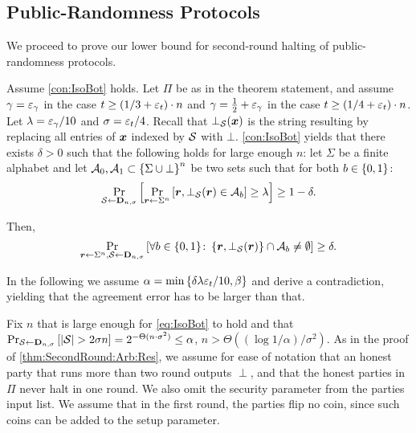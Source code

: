 \subsection{Public-Randomness Protocols}\label{sec:TwoRoundProtcol:PR}
We proceed to prove our lower bound for second-round halting of public-randomness protocols.


\begin{theorem} \label{thm:SecondRound:PR:Res}
	\ThmSeconRoundPR
\end{theorem}

Assume \cref{con:IsoBot} holds. Let $\Pi$ be as in the theorem statement, and assume $\gamma= \varepsilon_\gamma$ in the case $t \ge (1/3 +\varepsilon_t)\cdot n$ and $\gamma= \tfrac{1}{2} + \varepsilon_\gamma$ in the case $t \ge (1/4 +\varepsilon_t)\cdot n$. Let $\lambda =\varepsilon_\gamma /10$ and $\sigma= \varepsilon_t/4$. Recall that $\bot_{\mathcal{S}}({ \boldsymbol{x}})$ is the string resulting by replacing all entries of ${ \boldsymbol{x}}$ indexed by $\mathcal{S}$ with $\bot$.
\cref{con:IsoBot} yields that there exists $\delta>0$ such that the following holds for large enough $n$: let $\Sigma$ be a finite alphabet and let $\mathcal{A}_0,\mathcal{A}_1 \subset \left\{\Sigma \cup \bot\right\}^n$ be two sets such that for both $b\in \{0,1\}$:
\begin{align*}%
\ppr{\cs\gets \bns}{\ppr{\vr \gets \sn}{\vr,\bot_{\cS}(\vr) \in \cA_b} \ge \lambda} \ge 1-\delta.
\end{align*}

Then,
\begin{align}\label{eq:IsoBot}
\Pr_{{ \boldsymbol{r}}\gets \Sigma^n,\mathcal{S} \gets \mathbf{D}_{n,\sigma}}\left[\forall b\in \{0,1\}\colon \left\{{ \boldsymbol{r}},\bot_{\mathcal{S}}({ \boldsymbol{r}})\right\} \cap \mathcal{A}_b \neq \emptyset\right] \ge \delta.
\end{align}


In the following we assume $\alpha = \min\left\{\delta\lambda \varepsilon_t/10, \beta\right\}$ and derive a contradiction, yielding that the agreement error has to be larger than that.


Fix $n$ that is large enough for \cref{eq:IsoBot} to hold and that $\Pr_{{\cal{S}} \gets \mathbf{D}_{n,\sigma}}\left[\left|{\cal{S}}\right| > 2\sigma n\right] = 2^{- \Theta(n\cdot \sigma^2)} \le \alpha$, \ie $n> \Theta((\log 1/\alpha)/\sigma^2)$. As in the proof of \cref{thm:SecondRound:Arb:Res}, we assume for ease of notation that an honest party that runs more than two round outputs $\perp$, and that the honest parties in $\Pi$ never halt in one round. We also omit the security parameter from the parties input list. We assume \wlg that in the first round, the parties flip
no coin, since such coins can be added to the setup parameter.

